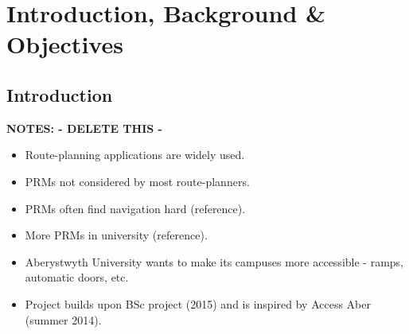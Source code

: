 \chapter{Introduction, Background \& Objectives}



   
   


\section{Introduction}
\textbf{NOTES: - DELETE THIS -}
\begin{itemize}
\item Route-planning applications are widely used.
\item PRMs not considered by most route-planners.
\item PRMs often find navigation hard (reference).
\item More PRMs in university (reference).
\item Aberystwyth University wants to make its campuses more accessible - ramps, automatic doors, etc.
\item Project builds upon BSc project (2015) and is inspired by Access Aber (summer 2014).
\end{itemize}


